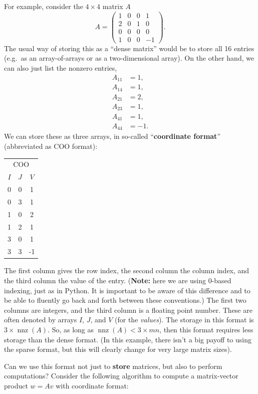\documentclass[12pt]{article}
\DeclareMathOperator{\nnz}{nnz}
\begin{document}
For example, consider the $4 \times 4$ matrix $A$
\[
   A = \begin{pmatrix}
      1 & 0 & 0 & 1 \\
      2 & 0 & 1 & 0 \\
      0 & 0 & 0 & 0 \\
      1 & 0 & 0 & -1
   \end{pmatrix}.
\]
The usual way of storing this as a ``dense matrix'' would be to store all 16 entries (e.g.\ as an array-of-arrays or as a two-dimensional array).
On the other hand, we can also just list the nonzero entries,
\begin{align*}
   A_{11} &= 1, \\
   A_{14} &= 1, \\
   A_{21} &= 2, \\
   A_{23} &= 1, \\
   A_{41} &= 1, \\
   A_{44} &= -1.
\end{align*}
We can store these as three arrays, in so-called ``\textbf{coordinate format}'' (abbreviated as COO format):
\begin{center}
   \begin{tabular}{ccc}
      \multicolumn{3}{c}{COO}\\
      $I$ & $J$ & $V$\\
      \hline
      0&0&1\\
      0&3&1\\
      1&0&2\\
      1&2&1\\
      3&0&1\\
      3&3&-1
   \end{tabular}
\end{center}
The first column gives the row index, the second column the column index, and the third column the value of the entry.
(\textbf{Note:} here we are using 0-based indexing, just as in Python. It is important to be aware of this difference and to be able to fluently go back and forth between these conventions.)
The first two columns are integers, and the third column is a floating point number.
These are often denoted by arrays $I$, $J$, and $V$ (for the \textit{values}).
The storage in this format is $3 \times \nnz(A)$.
So, as long as $\nnz(A) < 3 \times m n$, then this format requires less storage than the dense format.
(In this example, there isn't a big payoff to using the sparse format, but this will clearly change for very large matrix sizes).

Can we use this format not just to \textbf{store} matrices, but also to perform computations?
Consider the following algorithm to compute a matrix-vector product $w = A v$ with coordinate format:
\end{document}
